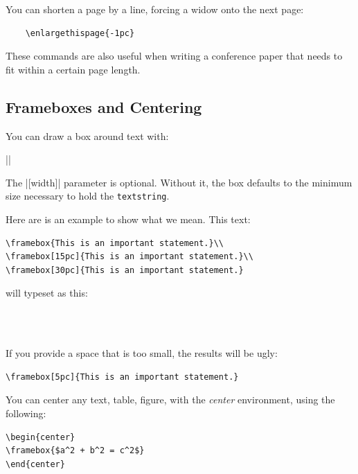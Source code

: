 You can shorten a page by a line, forcing a widow onto the next page:

\begin{verbatim}
    \enlargethispage{-1pc}
\end{verbatim}


These commands are also useful when writing a conference paper that
needs to fit within a certain page length.

\subsection{Frameboxes and Centering}

You can draw a box around text with:

||

The |[width]| parameter is optional. Without it, the box defaults to
the minimum size necessary to hold the \texttt{textstring}.

Here are is an example to show what we mean. This text:

\begin{Verbatim}
\framebox{This is an important statement.}\\
\framebox[15pc]{This is an important statement.}\\
\framebox[30pc]{This is an important statement.}
\end{Verbatim}

will typeset as this:

\\
\\

If you provide a space that is too small, the results will be ugly:

\begin{Verbatim}
\framebox[5pc]{This is an important statement.}
\end{Verbatim}


You can center any text, table, figure, \etc with the \emph{center} environment, using the following:

\begin{Verbatim}
\begin{center}
\framebox{$a^2 + b^2 = c^2$}
\end{center}
\end{Verbatim}

